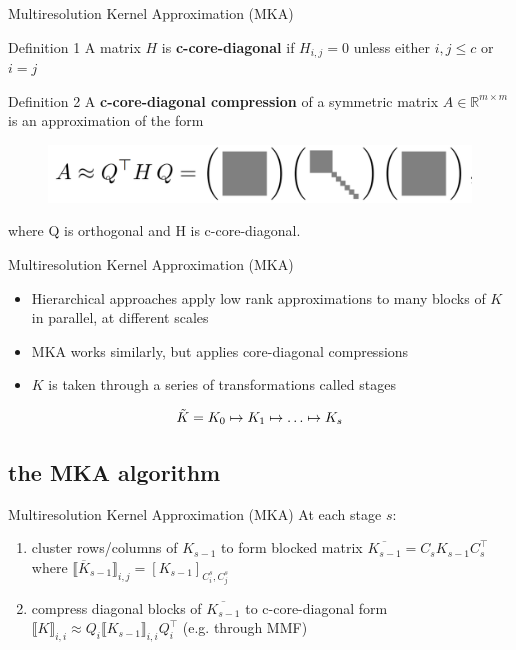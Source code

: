 \documentclass{beamer}
\begin{document}
\begin{frame}{Multiresolution Kernel Approximation (MKA)}
    \begin{block}{Definition 1}
     A matrix $H$ is \textbf{c-core-diagonal} if $H_{i,j}=0$ unless either $i,j\leq c$ or $i=j$
    \end{block}
    \begin{block}{Definition 2}
     A \textbf{c-core-diagonal compression} of a symmetric matrix $A\in\mathbb{R}^{m\times m}$ is an approximation of the form
    \begin{figure}
        \centering
        \includegraphics[width=0.8\linewidth]{figs/ccore.png}
    \end{figure}
    where Q is orthogonal and H is c-core-diagonal.
    \end{block}
\end{frame}

\begin{frame}{Multiresolution Kernel Approximation (MKA)}
\begin{itemize}
    \item Hierarchical approaches apply low rank approximations to many blocks of $K$ in parallel, at different scales
    \item  MKA works similarly, but applies core-diagonal compressions
    \pause
    \item $K$ is taken through a series of transformations called stages
\end{itemize}
\begin{align*}
    \Tilde{K}=K_0\mapsto K_1\mapsto\hdots\mapsto K_s
\end{align*}
\end{frame}

\subsection{the MKA algorithm}

\begin{frame}{Multiresolution Kernel Approximation (MKA)}
At each stage $s$:
    \begin{enumerate}
        \item cluster rows/columns of $K_{s-1}$ to form blocked matrix $\overline{K_{s-1}}=C_sK_{s-1}C_s^\top$ where $\llbracket \overline{K}_{s-1}\rrbracket_{i,j}=[K_{s-1}]_{C_i^s, C_j^s}$
        \item compress diagonal blocks of $\overline{K_{s-1}}$ to c-core-diagonal form $\llbracket K\rrbracket_{i,i}\approx Q_i\llbracket K_{s-1}\rrbracket_{i,i}Q_i^\top$ (e.g. through MMF\cite{kondor2014multiresolution})
    \end{enumerate}
\end{frame}
\end{document}
